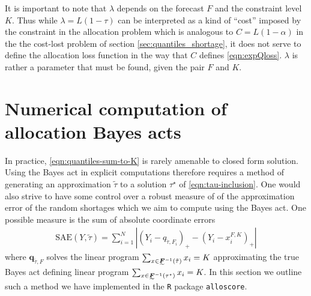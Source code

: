 \documentclass{article}\usepackage[]{graphicx}\usepackage[]{xcolor}
\begin{document}
It is important to note that $\lambda$ depends on the forecast $F$ and the constraint level $K$. Thus while $\lambda = L(1-\tau)$ can be
interpreted as a kind of ``cost'' imposed by the constraint in the allocation problem which is analogous to $C = L(1-\alpha)$ in the  
the cost-lost problem of section \ref{sec:quantiles_shortage}, it does not serve to define the allocation loss function in the way that $C$ defines \eqref{eqn:expQloss}. $\lambda$ is rather a parameter that must be found, given the pair $F$ and $K$.

\section{Numerical computation of allocation Bayes acts}
\label{sec:numeric}

In practice, \eqref{eqn:quantiles-sum-to-K} is rarely amenable to closed form solution.
Using the Bayes act in explicit computations therefore requires a method of generating an approximation $\tilde{\tau}$ to 
a solution $\tau^{\star}$ of \eqref{eqn:tau-inclusion}.  One would also strive to have some control over a robust measure of 
of the approximation error of the random shortages which we aim to compute using the Bayes act. One possible measure is the sum
of absolute coordinate errors
\begin{align}
\mathrm{SAE}(Y,\tilde{\tau}) = \sum_{i=1}^{N} \left| (Y_i-q_{\tilde{\tau},F_i})_+ - (Y_i-x_i^{F,K})_+ \right|
\end{align}
where $\bm{q}_{\tilde{\tau},F}$ solves the linear program
$\sum_{x \in \undertilde{\bm{F}}^{-1}(\tilde{\tau})}x_i = K$ approximating the true Bayes act defining linear program
$\sum_{x \in \undertilde{\bm{F}}^{-1}(\tau^{\star})}x_i = K$. In this section we outline such a method we have implemented 
in the \verb`R` package \verb`alloscore`.
\end{document}
